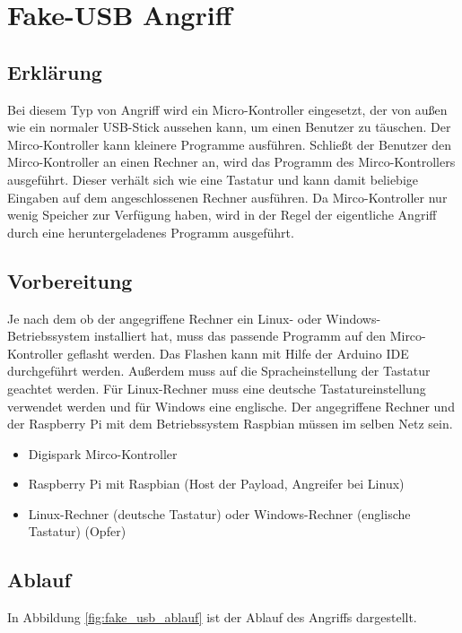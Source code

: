 \chapter{Fake-USB Angriff}
\label{chapter_fake_usb}



\section{Erklärung}
Bei diesem Typ von Angriff wird ein Micro-Kontroller eingesetzt, der von außen wie ein normaler USB-Stick aussehen kann, um einen Benutzer zu täuschen. Der Mirco-Kontroller kann kleinere Programme ausführen. Schließt der Benutzer den Mirco-Kontroller an einen Rechner an, wird das Programm des Mirco-Kontrollers ausgeführt. Dieser verhält sich wie eine Tastatur und kann damit beliebige Eingaben auf dem angeschlossenen Rechner ausführen. Da Mirco-Kontroller nur wenig Speicher zur Verfügung haben, wird in der Regel der eigentliche Angriff durch eine heruntergeladenes Programm ausgeführt. 


\section{Vorbereitung}
Je nach dem ob der angegriffene Rechner ein Linux- oder Windows-Betriebssystem installiert hat, muss das passende Programm auf den Mirco-Kontroller geflasht werden. Das Flashen kann mit Hilfe der Arduino IDE durchgeführt werden. Außerdem muss auf die Spracheinstellung der Tastatur geachtet werden. Für Linux-Rechner muss eine deutsche Tastatureinstellung verwendet werden und für Windows eine englische.
Der angegriffene Rechner und der Raspberry Pi mit dem Betriebssystem Raspbian müssen im selben Netz sein.

\begin{itemize}
\item Digispark Mirco-Kontroller
\item Raspberry Pi mit Raspbian (Host der Payload, Angreifer bei Linux)
\item Linux-Rechner (deutsche Tastatur) oder Windows-Rechner (englische Tastatur) (Opfer)
\end{itemize}

\section{Ablauf}
In Abbildung \ref{fig:fake_usb_ablauf} ist der Ablauf des Angriffs dargestellt. 

